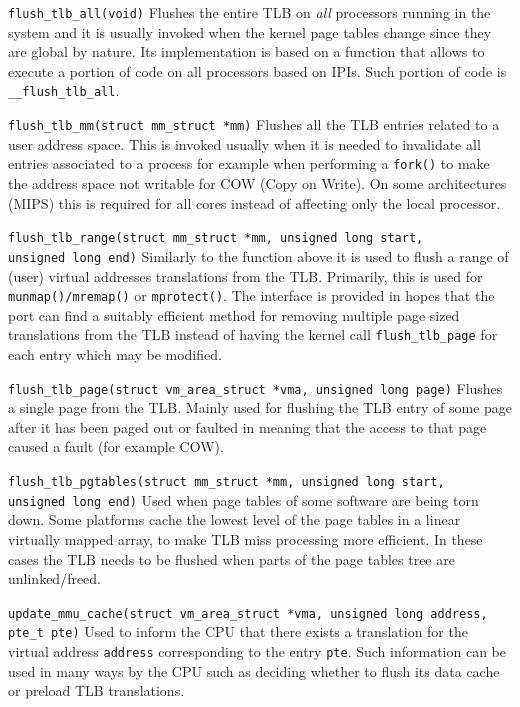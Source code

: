 \documentclass[twoside]{article}
\begin{document}
\begin{description}
    \itemsep0pt
    \item \texttt{flush_tlb_all(void)} Flushes the entire TLB on
        \textit{all} processors running in the system and it is usually
        invoked when the kernel page tables change since they are global
        by nature. Its implementation is based on a function that allows
        to execute a portion of code on all processors based on IPIs.
        Such portion of code is \texttt{__flush_tlb_all}.
    \item \texttt{flush_tlb_mm(struct mm_struct *mm)} Flushes all the TLB
        entries related to a user address space. This is invoked usually
        when it is needed to invalidate all entries associated to a process
        for example when performing a \texttt{fork()} to make the address
        space not writable for COW (Copy on Write). On some architectures
        (MIPS) this is required for all cores instead of affecting only
        the local processor.
    \item \texttt{flush_tlb_range(struct mm_struct *mm, unsigned long
        start, \\ unsigned long end)} Similarly to the function above it is
        used to flush a range of (user) virtual addresses translations from
        the TLB. Primarily, this is used for \texttt{munmap()/mremap()} or
        \texttt{mprotect()}. The interface is provided in hopes that the
        port can find a suitably efficient method for removing multiple page
        sized translations from the TLB instead of having the kernel call
        \texttt{flush_tlb_page} for each entry which may be modified.
    \item \texttt{flush_tlb_page(struct vm_area_struct *vma, unsigned long
        page)} Flushes a single page from the TLB. Mainly used for flushing
        the TLB entry of some page after it has been paged out or faulted in
        meaning that the access to that page caused a fault (for example COW).
    \item \texttt{flush_tlb_pgtables(struct mm_struct *mm, unsigned long
        start, \\ unsigned long end)} Used when page tables of some software
        are being torn down. Some platforms cache the lowest level of the
        page tables in a linear virtually mapped array, to make TLB miss
        processing more efficient. In these cases the TLB needs to be flushed
        when parts of the page tables tree are unlinked/freed.
    \item \texttt{update_mmu_cache(struct vm_area_struct *vma, unsigned long
        address, \\ pte_t pte)} Used to inform the CPU that there exists
        a translation for the virtual address \texttt{address} corresponding
        to the entry \texttt{pte}. Such information can be used in many ways
        by the CPU such as deciding whether to flush its data cache or
        preload TLB translations.
\end{description}
\end{document}
